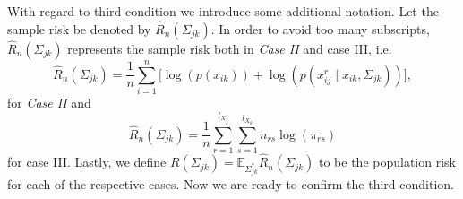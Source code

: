 With regard to third condition we introduce some additional notation. Let the sample risk be denoted by $\hat{R}_n(\Sigma_{jk})$. In order to avoid too many subscripts, $\hat{R}_n(\Sigma_{jk})$ represents the sample risk both in \textit{Case II} and case III, i.e. 
\begin{equation*}
    \hat{R}_n(\Sigma_{jk}) = \frac{1}{n} \sum_{i=1}^n \big[\log(p(x_{ik})) + \log(p(x_{ij}^{r} \mid x_{ik}, \Sigma_{jk}))\big],
\end{equation*}
for \textit{Case II} and
\begin{equation*}
    \hat{R}_n(\Sigma_{jk}) = \frac{1}{n} \sum_{r=1}^{l_{X_{j}}}\sum_{s=1}^{l_{X_{k}}} n_{rs} \log(\pi_{rs})    
\end{equation*}
for case III. Lastly, we define $R(\Sigma_{jk}) = \mathbb{E}_{\Sigma_{jk}^*}\hat{R}_n(\Sigma_{jk})$ to be the population risk for each of the respective cases. Now we are ready to confirm the third condition.   
